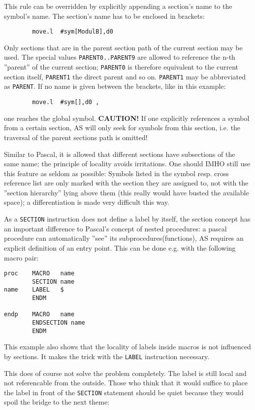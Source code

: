 \documentclass[12pt,twoside]{report}
\newcommand{\bb}[1]{{\bf #1}}
\newcommand{\tty}[1]{{\tt #1}}
\begin{document}
This rule can be overridden by explicitly appending a section's name
to the symbol's name.  The section's name has to be enclosed in
brackets:
\begin{verbatim}
        move.l  #sym[ModulB],d0
\end{verbatim}
Only sections that are in the parent section path of the current
section may be used.  The special values \tty{PARENT0..PARENT9} are allowed
to reference the n-th ''parent'' of the current section; \tty{PARENT0} is
therefore equivalent to the current section itself, \tty{PARENT1} the
direct parent and so on.  \tty{PARENT1} may be abbreviated as \tty{PARENT}.  If
no name is given between the brackets, like in this example:
\begin{verbatim}
        move.l  #sym[],d0 ,
\end{verbatim}
one reaches the global symbol.  \bb{CAUTION!}  If one explicitly
references a symbol from a certain section, AS will only seek for
symbols from this section, i.e. the traversal of the parent sections
path is omitted!

Similar to Pascal, it is allowed that different sections have
subsections of the same name; the principle of locality avoids
irritations.  One should IMHO still use this feature as seldom as
possible: Symbols listed in the symbol resp. cross reference list are
only marked with the section they are assigned to, not with the
''section hierarchy'' lying above them (this really would have busted
the available space); a differentiation is made very difficult this
way.

As a \tty{SECTION} instruction does not define a label by itself, the
section concept has an important difference to Pascal's concept of
nested procedures: a pascal procedure can automatically ''see'' its
subprocedures(functions), AS requires an explicit definition of an
entry point.  This can be done e.g. with the following macro pair:
\begin{verbatim}
proc    MACRO   name
        SECTION name
name    LABEL   $
        ENDM

endp    MACRO   name
        ENDSECTION name
        ENDM
\end{verbatim}
This example also shows that the locality of labels inside macros
is not influenced by sections.  It makes the trick with the \tty{LABEL}
instruction necessary.

This does of course not solve the problem completely.  The label is
still local and not referencable from the outside.  Those who think
that it would suffice to place the label in front of the \tty{SECTION}
statement should be quiet because they would spoil the bridge to the
next theme:
\end{document}
